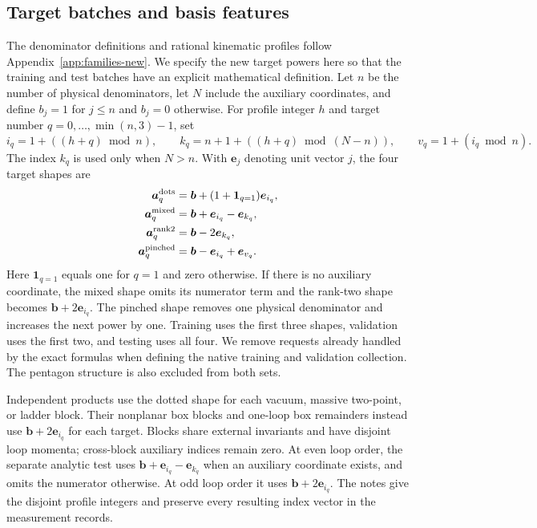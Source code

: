 \subsection{Target batches and basis features}
\label{app:total-targets}
The denominator definitions and rational kinematic profiles follow Appendix~\ref{app:families-new}. We specify the new target powers here so that the training and test batches have an explicit mathematical definition. Let $n$ be the number of physical denominators, let $N$ include the auxiliary coordinates, and define $b_j=1$ for $j\leq n$ and $b_j=0$ otherwise. For profile integer $h$ and target number $q=0,\ldots,\min(n,3)-1$, set
\begin{equation}
 i_q=1+((h+q)\bmod n),\qquad
 k_q=n+1+((h+q)\bmod(N-n)),\qquad
 v_q=1+(i_q\bmod n).
\end{equation}
The index $k_q$ is used only when $N>n$. With $\boldsymbol e_j$ denoting unit vector $j$, the four target shapes are
\begin{align}
 \boldsymbol a_q^{\rm dots}&=\boldsymbol b+(1+\mathbf1_{q=1})\boldsymbol e_{i_q},\\
 \boldsymbol a_q^{\rm mixed}&=\boldsymbol b+\boldsymbol e_{i_q}-\boldsymbol e_{k_q},\\
 \boldsymbol a_q^{\rm rank2}&=\boldsymbol b-2\boldsymbol e_{k_q},\\
 \boldsymbol a_q^{\rm pinched}&=\boldsymbol b-\boldsymbol e_{i_q}+\boldsymbol e_{v_q}.
\end{align}
Here $\mathbf1_{q=1}$ equals one for $q=1$ and zero otherwise. If there is no auxiliary coordinate, the mixed shape omits its numerator term and the rank-two shape becomes $\boldsymbol b+2\boldsymbol e_{i_q}$. The pinched shape removes one physical denominator and increases the next power by one. Training uses the first three shapes, validation uses the first two, and testing uses all four. We remove requests already handled by the exact formulas when defining the native training and validation collection. The pentagon structure is also excluded from both sets.

Independent products use the dotted shape for each vacuum, massive two-point, or ladder block. Their nonplanar box blocks and one-loop box remainders instead use $\boldsymbol b+2\boldsymbol e_{i_q}$ for each target. Blocks share external invariants and have disjoint loop momenta; cross-block auxiliary indices remain zero. At even loop order, the separate analytic test uses $\boldsymbol b+\boldsymbol e_{i_q}-\boldsymbol e_{k_q}$ when an auxiliary coordinate exists, and omits the numerator otherwise. At odd loop order it uses $\boldsymbol b+2\boldsymbol e_{i_q}$. The notes give the disjoint profile integers and preserve every resulting index vector in the measurement records.

